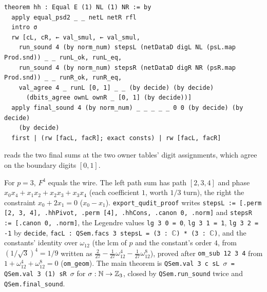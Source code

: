 \begin{example}
\begin{lstlisting}[style=lean]
theorem hh : Equal E (1) NL (1) NR := by
  apply equal_psd2 _ _ netL netR rfl
  intro σ
  rw [cL, cR, ← val_smul, ← val_smul,
    run_sound 4 (by norm_num) stepsL (netDataD digL NL (psL.map Prod.snd)) _ _ runL_ok, runL_eq,
    run_sound 4 (by norm_num) stepsR (netDataD digR NR (psR.map Prod.snd)) _ _ runR_ok, runR_eq,
    val_agree 4 _ runL [0, 1] _ _ (by decide) (by decide)
      (dbits_agree ownL ownR _ [0, 1] (by decide))]
  apply final_sound 4 (by norm_num) _ _ _ _ _ 0 0 (by decide) (by decide)
    (by decide)
  first | (rw [facL, facR]; exact consts) | rw [facL, facR]
\end{lstlisting}
reads the two final sums at the two owner tables' digit assignments, which agree on the boundary
digits $[0,1]$.
\end{example}

\begin{example}
For $p=3$, $F^4$ equals the wire. The left path sum has path $[2,3,4]$ and phase
$x_0x_4 + x_1x_2 + x_2x_3 + x_3x_4$ (each coefficient $1$, worth $1/3$ turn), the right the
constraint $x_0 + 2x_1 = 0$ ($x_0 - x_1$). \textnormal{\texttt{export\_\allowbreak{}qudit\_\allowbreak{}proof}} writes
\textnormal{\texttt{stepsL := [.\allowbreak{}perm [2,\allowbreak{} 3,\allowbreak{} 4],\allowbreak{} .\allowbreak{}hhPivot,\allowbreak{} .\allowbreak{}perm [4],\allowbreak{} .\allowbreak{}hhCons,\allowbreak{} .\allowbreak{}canon 0,\allowbreak{} .\allowbreak{}norm]}} and
\textnormal{\texttt{stepsR := [.\allowbreak{}canon 0,\allowbreak{} .\allowbreak{}norm]}}, the Legendre values \textnormal{\texttt{lg 3 0 = 0}}, \textnormal{\texttt{lg 3 1 = 1}},
\textnormal{\texttt{lg 3 2 = -{}1}} by \textnormal{\texttt{decide}}, \textnormal{\texttt{facL : QSem.\allowbreak{}facs 3 stepsL = (\allowbreak{}3 : \ensuremath{\mathbb{C}}) * (\allowbreak{}3 : \ensuremath{\mathbb{C}})}}, and the
constants' identity over $\omega_{12}$ (the lcm of $p$ and the constant's order $4$, from
$(1/\sqrt3)^4 = 1/9$ written as $\frac{2}{27}-\frac1{27}\omega_{12}^4-\frac1{27}\omega_{12}^8$),
proved after \textnormal{\texttt{om\_\allowbreak{}sub 12 3 4}} from $1+\omega_{12}^4+\omega_{12}^8=0$ (\textnormal{\texttt{om\_\allowbreak{}geom}}). The main
theorem is \textnormal{\texttt{QSem.\allowbreak{}val 3 c sL \ensuremath{\sigma} = QSem.\allowbreak{}val 3 (\allowbreak{}1) sR \ensuremath{\sigma}}} for $\sigma:\mathbb{N}\to\mathbb{Z}_{3}$, closed by
\textnormal{\texttt{QSem.\allowbreak{}run\_\allowbreak{}sound}} twice and \textnormal{\texttt{QSem.\allowbreak{}final\_\allowbreak{}sound}}.
\end{example}

